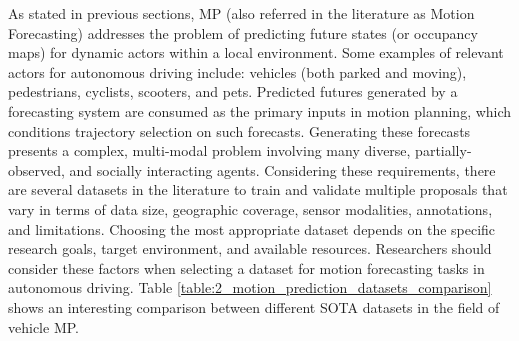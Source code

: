 As stated in previous sections, \ac{MP} (also referred in the literature as Motion Forecasting) addresses the problem of predicting future states (or occupancy maps) for dynamic actors within a local environment. Some examples of relevant actors for autonomous driving include: vehicles (both parked and moving), pedestrians, cyclists, scooters, and pets. Predicted futures generated by a forecasting system are consumed as the primary inputs in motion planning, which conditions trajectory selection on such forecasts. Generating these forecasts presents a complex, multi-modal problem involving many diverse, partially-observed, and socially interacting agents. Considering these requirements, there are several datasets in the literature to train and validate multiple proposals that vary in terms of data size, geographic coverage, sensor modalities, annotations, and limitations. Choosing the most appropriate dataset depends on the specific research goals, target environment, and available resources. Researchers should consider these factors when selecting a dataset for motion forecasting tasks in autonomous driving. Table \ref{table:2_motion_prediction_datasets_comparison} shows an interesting comparison between different \ac{SOTA} datasets in the field of vehicle \ac{MP}.

